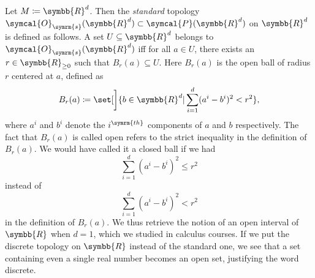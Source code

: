 \documentclass[a4 paper, 11pt]{book}
\theoremstyle{definition}
\newcommand{\rr}{\symbb{R}}
\newcommand{\topology}{\symcal{O}}
\newcommand{\powerset}{\symcal{P}}
\newcommand{\ball}{B}
\begin{document}
    Let \(M \coloneq \rr^d\). Then the \textit{standard} topology \(\topology_{\symrm{s}}(\rr^d) \subset \powerset(\rr^d)\) on \(\rr^d\) is defined as follows. A set \(U \subseteq \rr^d\) belongs to \(\topology_{\symrm{s}}(\rr^d)\) iff for all \(a \in U\), there exists an \(r \in \rr_{\geq 0}\) such that \(\ball_r(a) \subseteq U\). Here \(\ball_r(a)\) is the open ball of radius \(r\) centered at \(a\), defined as 
    \[
        \ball_r(a) \coloneq \set[\bigg]{b \in \rr^d | \sum_{i=1}^d (a^i - b^i)^2 < r^2},
    \] 
    where \(a^i\) and \(b^i\) denote the \(i^{\symrm{th}}\) components of \(a\) and \(b\) respectively. The fact that \(\ball_r(a)\) is called open refers to the strict inequality in the definition of \(\ball_r(a)\). We would have called it a closed ball if we had \[\sum_{i=1}^d (a^i - b^i)^2 \leq r^2\] instead of \[\sum_{i=1}^d (a^i - b^i)^2 < r^2\] in the definition of \(\ball_r(a)\). We thus retrieve the notion of an open interval of \(\rr\) when \(d = 1\), which we studied in calculus courses. If we put the discrete topology on \(\rr\) instead of the standard one, we see that a set containing even a single real number becomes an open set, justifying the word discrete.
\end{document}
